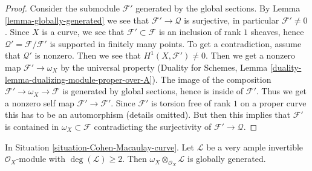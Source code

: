 \begin{proof}
Consider the submodule $\mathcal{F}'$ generated by the global sections. By
Lemma \ref{lemma-globally-generated} we see that $\mathcal{F}' \to \mathcal{Q}$
is surjective, in particular $\mathcal{F}' \not = 0$. Since $X$ is a curve, we
see that $\mathcal{F}' \subset \mathcal{F}$ is an inclusion of rank $1$
sheaves, hence $\mathcal{Q}' = \mathcal{F}/\mathcal{F}'$ is supported in
finitely many points. To get a contradiction, assume that
$\mathcal{Q}'$ is nonzero. Then we see that $H^1(X, \mathcal{F}') \not = 0$.
Then we get a nonzero map $\mathcal{F}' \to \omega_X$ by the universal
property (Duality for Schemes, Lemma
\ref{duality-lemma-dualizing-module-proper-over-A}).
The image of the composition $\mathcal{F}' \to \omega_X \to \mathcal{F}$
is generated by global sections, hence is inside of $\mathcal{F}'$.
Thus we get a nonzero self map $\mathcal{F}' \to \mathcal{F}'$.
Since $\mathcal{F}'$ is torsion free of rank $1$ on a proper curve
this has to be an automorphism (details omitted). But then this implies that
$\mathcal{F}'$ is contained in $\omega_X \subset \mathcal{F}$
contradicting the surjectivity of $\mathcal{F}' \to \mathcal{Q}$.
\end{proof}

\begin{lemma}
\label{lemma-tensor-omega-with-globally-generated-invertible}
In Situation \ref{situation-Cohen-Macaulay-curve}. Let $\mathcal{L}$
be a very ample invertible $\mathcal{O}_X$-module with
$\deg(\mathcal{L}) \geq 2$. Then
$\omega_X \otimes_{\mathcal{O}_X} \mathcal{L}$ is globally generated.
\end{lemma}


